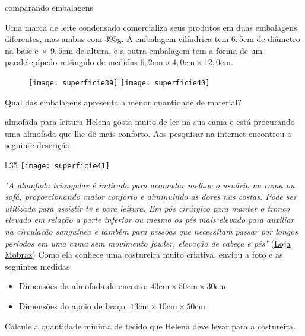 \begin{task}{comparando embalagens}

Uma marca de leite condensado comercializa seus produtos em duas embalagens diferentes, mas ambas com $395$g. A embalagem cilíndrica tem $6{,}5$cm de diâmetro na base e $\times$ $9{,}5$cm de altura, e a outra embalagem tem a forma de um paralelepípedo retângulo de medidas $6{,}2\text{cm}\times4{,}0\text{cm}\times12{,}0\text{cm}$.

\begin{figure}[H]
\centering

\texttt{[image: superficie39]}
\hspace{1cm}
\texttt{[image: superficie40]}

\end{figure}

Qual das embalagens apresenta a menor quantidade de material?

\end{task}
\begin{task}{almofada para leitura}
Helena gosta muito de ler na sua cama e está procurando uma almofada que lhe dê  mais conforto. Aos pesquisar na internet encontrou a seguinte descrição:

\begin{wrapfigure}[10]{l}{.35\textwidth}
\vspace{-1em}
\texttt{[image: superficie41]}
\end{wrapfigure}
\textit{"A almofada triangular é indicada para acomodar melhor o usuário na cama ou sofá, proporcionando maior conforto e diminuindo as dores nas costas. Pode ser utilizada para assistir tv e para leitura. Em pós cirúrgico para manter o tronco elevado em relação a parte inferior ou mesmo os pés mais elevado para auxiliar na circulação sanguínea e também para pessoas que necessitam passar por longos períodos em uma cama sem movimento fowler, elevação de cabeça e pés"}
\flushright
(\href{https://www.mobraz.com.br/produto/almofada-triangular-para-leitura-perfetto}{Loja Mobraz})
\justify
\clearpage
Como ela conhece uma costureira muito criativa, enviou a foto e as seguintes medidas:
\begin{itemize}
  \item Dimensões da almofada de encosto: $43\text{cm}\times50\text{cm}\times30\text{cm}$;
  \item Dimensões do apoio de braço: $13\text{cm}\times10\text{cm}\times50\text{cm}$
\end{itemize}
\noindent Calcule a quantidade mínima de tecido que Helena deve levar para a costureira.
\end{task}

